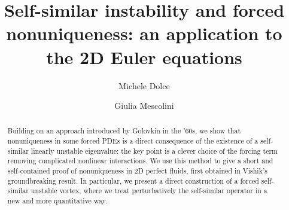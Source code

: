 \documentclass[11pt,reqno]{amsproc}
\title[Forced nonuniqueness in 2D Euler]{Self-similar instability and forced nonuniqueness: an application to the 2D Euler equations}
\author[M. Dolce]{Michele Dolce}
\author[G. Mescolini]{Giulia Mescolini}
\theoremstyle{definition}
\theoremstyle{definition}
\numberwithin{equation}{section}
\begin{document}
\begin{abstract}
Building on an approach introduced by Golovkin in the '60s, we show that nonuniqueness in some forced PDEs is a direct consequence of the existence of a self-similar linearly unstable eigenvalue: the key point is a clever choice of the forcing term removing complicated nonlinear interactions. We use this method to give a short and self-contained proof of nonuniqueness in 2D perfect fluids, first obtained in Vishik's groundbreaking result.
 In particular, we present a direct construction of a forced self-similar unstable vortex, where we treat perturbatively the self-similar operator  in a new and more quantitative way. 
\end{abstract}

\maketitle
\end{document}
